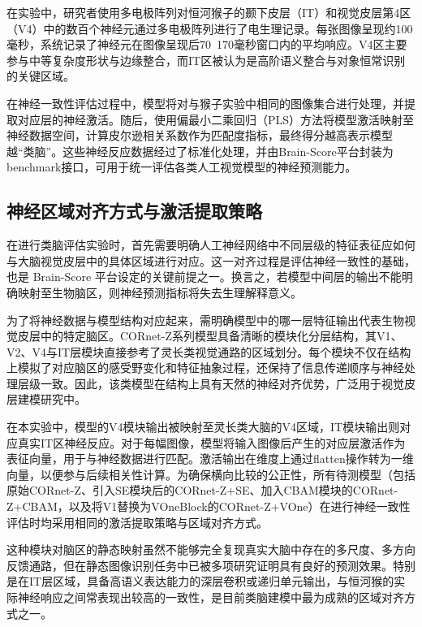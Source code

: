 在实验中，研究者使用多电极阵列对恒河猴子的颞下皮层（IT）和视觉皮层第4区（V4）中的数百个神经元通过多电极阵列进行了电生理记录。每张图像呈现约100毫秒，系统记录了神经元在图像呈现后70~170毫秒窗口内的平均响应。V4区主要参与中等复杂度形状与边缘整合，而IT区被认为是高阶语义整合与对象恒常识别的关键区域\cite{dicarlo2012does}。

在神经一致性评估过程中，模型将对与猴子实验中相同的图像集合进行处理，并提取对应层的神经激活。随后，使用偏最小二乘回归（PLS）方法将模型激活映射至神经数据空间，计算皮尔逊相关系数作为匹配度指标，最终得分越高表示模型越“类脑”。这些神经反应数据经过了标准化处理，并由Brain-Score平台封装为benchmark接口，可用于统一评估各类人工视觉模型的神经预测能力。

\subsection{神经区域对齐方式与激活提取策略}

在进行类脑评估实验时，首先需要明确人工神经网络中不同层级的特征表征应如何与大脑视觉皮层中的具体区域进行对应。这一对齐过程是评估神经一致性的基础，也是 Brain-Score 平台设定的关键前提之一。换言之，若模型中间层的输出不能明确映射至生物脑区，则神经预测指标将失去生理解释意义\cite{schrimpf2018brain}。

为了将神经数据与模型结构对应起来，需明确模型中的哪一层特征输出代表生物视觉皮层中的特定脑区。CORnet-Z系列模型具备清晰的模块化分层结构，其V1、V2、V4与IT层模块直接参考了灵长类视觉通路的区域划分。每个模块不仅在结构上模拟了对应脑区的感受野变化和特征抽象过程，还保持了信息传递顺序与神经处理层级一致。因此，该类模型在结构上具有天然的神经对齐优势，广泛用于视觉皮层建模研究中\cite{kubilius2019brain}。

在本实验中，模型的V4模块输出被映射至灵长类大脑的V4区域，IT模块输出则对应真实IT区神经反应。对于每幅图像，模型将输入图像后产生的对应层激活作为表征向量，用于与神经数据进行匹配。激活输出在维度上通过flatten操作转为一维向量，以便参与后续相关性计算。为确保横向比较的公正性，所有待测模型（包括原始CORnet-Z、引入SE模块后的CORnet-Z+SE、加入CBAM模块的CORnet-Z+CBAM，以及将V1替换为VOneBlock的CORnet-Z+VOne）在进行神经一致性评估时均采用相同的激活提取策略与区域对齐方式。

这种模块对脑区的静态映射虽然不能够完全复现真实大脑中存在的多尺度、多方向反馈通路，但在静态图像识别任务中已被多项研究证明具有良好的预测效果。特别是在IT层区域，具备高语义表达能力的深层卷积或递归单元输出，与恒河猴的实际神经响应之间常表现出较高的一致性，是目前类脑建模中最为成熟的区域对齐方式之一\cite{rajalingham2018large}。


